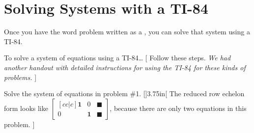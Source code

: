 \section{Solving Systems with a TI-84}

Once you have the word problem 
written as a ,
you can solve that system using a TI-84.

\begin{myConceptSteps}{To solve a system of equations using a TI-84\dots}
  [
    Follow these steps.
    {
      \itshape
      We had another handout with detailed instructions 
      for using the TI-84 for these kinds of problems.
    }
  ]
\end{myConceptSteps}

\myWideProblem
{
  Solve the system of equations in problem \#1.
}[\normalsize]{3.75in}[
  \footnotesize
  The reduced row echelon form looks like
  \(
    \begin{bmatrix}[cc|c]
        \boldsymbol{1} & 0  & \blacksquare \\
        0 & \boldsymbol{1}  & \blacksquare 
    \end{bmatrix}
\),
 because there are only two equations in this problem.
]